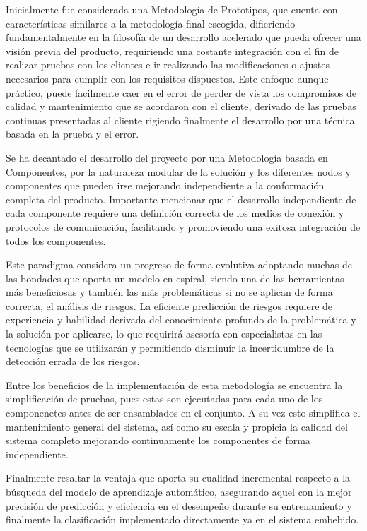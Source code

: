 \hfill \break
\justifying
Inicialmente fue considerada una Metodología de Prototipos, que cuenta con características similares a la metodología final escogida, difieriendo fundamentalmente en la filosofía de un desarrollo acelerado que pueda ofrecer una visión previa del producto, requiriendo una costante integración con el fin de realizar pruebas con los clientes e ir realizando las modificaciones o ajustes necesarios para cumplir con los requisitos dispuestos. Este enfoque aunque práctico, puede facilmente caer en el error de perder de vista los compromisos de calidad y mantenimiento que se acordaron con el cliente, derivado de las pruebas continuas presentadas al cliente rigiendo finalmente el desarrollo por una técnica basada en la prueba y el error.

\hfill \break
\justifying
Se ha decantado el desarrollo del proyecto por una Metodología basada en Componentes, por la naturaleza modular de la solución y los diferentes nodos y componentes que pueden irse mejorando independiente a la conformación completa del producto. Importante mencionar que el desarrollo independiente de cada componente requiere una definición correcta de los medios de conexión y protocolos de comunicación, facilitando y promoviendo una exitosa integración de todos los componentes.

\hfill \break
\justifying
Este paradigma considera un progreso de forma evolutiva adoptando muchas de las bondades que aporta un modelo en espiral, siendo una de las herramientas más beneficiosas y también las más problemáticas si no se aplican de forma correcta, el análisis de riesgos. La eficiente predicción de riesgos requiere de experiencia y habilidad derivada del conocimiento profundo de la problemática y la solución por aplicarse, lo que requirirá asesoría con especialistas en las tecnologías que se utilizarán y permitiendo disminuír la incertidumbre de la detección errada de los riesgos.

\hfill \break
\justifying
Entre los beneficios de la implementación de esta metodología se encuentra la simplificación de pruebas, pues estas son ejecutadas para cada uno de los componenetes antes de ser ensamblados en el conjunto. A su vez esto simplifica el mantenimiento general del sistema, así como su escala y propicia la calidad del sistema completo mejorando continuamente los componentes de forma independiente.

\hfill \break
\justifying
Finalmente resaltar la ventaja que aporta su cualidad incremental respecto a la búsqueda del modelo de aprendizaje automático, asegurando aquel con la mejor precisión de predicción y eficiencia en el desempeño durante su entrenamiento y finalmente la clasificación implementado directamente ya en el sistema embebido.


